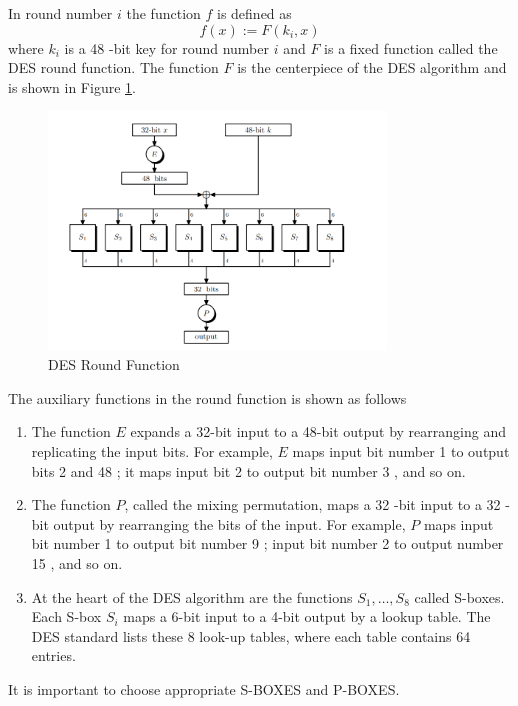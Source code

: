 In round number $i$ the function $f$ is defined as
$$
f(x):=F\left(k_{i}, x\right)
$$
where $k_{i}$ is a 48 -bit key for round number $i$ and $F$ is a fixed function called the DES round function. The function $F$ is the centerpiece of the DES algorithm and is shown in Figure \ref{fig: 03 DES Round Function}.

\begin{figure}[h]
    \centering
    \includegraphics[width=0.8\textwidth]{Stanford_Crypto_1/fig/03_block_cipher/DES Round Function.png}
    \caption{DES Round Function}
    \label{fig: 03 DES Round Function}
\end{figure}

The auxiliary functions in the round function is shown as follows

\begin{enumerate} [itemsep=2pt,topsep=0pt,parsep=0pt]
    \item The function $E$ expands a 32-bit input to a 48-bit output by rearranging and replicating the input bits. For example, $E$ maps input bit number 1 to output bits 2 and 48 ; it maps input bit 2 to output bit number 3 , and so on.
    \item The function $P$, called the mixing permutation, maps a 32 -bit input to a 32 -bit output by rearranging the bits of the input. For example, $P$ maps input bit number 1 to output bit number 9 ; input bit number 2 to output number 15 , and so on.
    \item At the heart of the DES algorithm are the functions $S_{1}, \ldots, S_{8}$ called S-boxes. Each S-box $S_{i}$ maps a 6-bit input to a 4-bit output by a lookup table. The DES standard lists these 8 look-up tables, where each table contains 64 entries.
\end{enumerate}

It is important to choose appropriate S-BOXES and P-BOXES.

